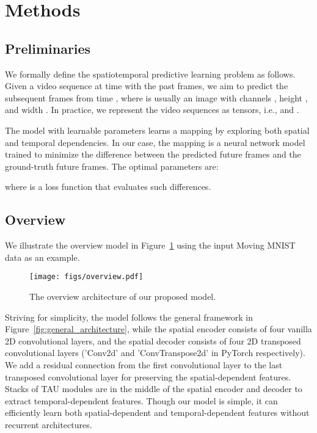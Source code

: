\documentclass[10pt,twocolumn,letterpaper]{article}
\begin{document}
\section{Methods} 

\subsection{Preliminaries}

We formally define the spatiotemporal predictive learning problem as follows. Given a video sequence  at time  with the past  frames, we aim to predict the subsequent  frames  from time , where  is usually an image with channels , height , and width . In practice, we represent the video sequences as tensors, i.e.,   and .

The model with learnable parameters  learns a mapping  by exploring both spatial and temporal dependencies. In our case, the mapping  is a neural network model trained to minimize the difference between the predicted future frames and the ground-truth future frames. The optimal parameters  are:

where  is a loss function that evaluates such differences.

\subsection{Overview}

We illustrate the overview model in Figure~\ref{fig:overview} using the input Moving MNIST~\cite{srivastava2015unsupervised} data as an example.

\begin{figure}[htbp]
\centering
\texttt{[image: figs/overview.pdf]} 
\caption{The overview architecture of our proposed model.}
\label{fig:overview} 
\end{figure}

Striving for simplicity, the model follows the general framework in Figure~\ref{fig:general_architecture}, while the spatial encoder consists of four vanilla 2D convolutional layers, and the spatial decoder consists of four 2D transposed convolutional layers ('Conv2d' and 'ConvTranspose2d' in PyTorch respectively). We add a residual connection from the first convolutional layer to the last transposed convolutional layer for preserving the spatial-dependent features. Stacks of TAU modules are in the middle of the spatial encoder and decoder to extract temporal-dependent features. Though our model is simple, it can efficiently learn both spatial-dependent and temporal-dependent features without recurrent architectures.
\end{document}

